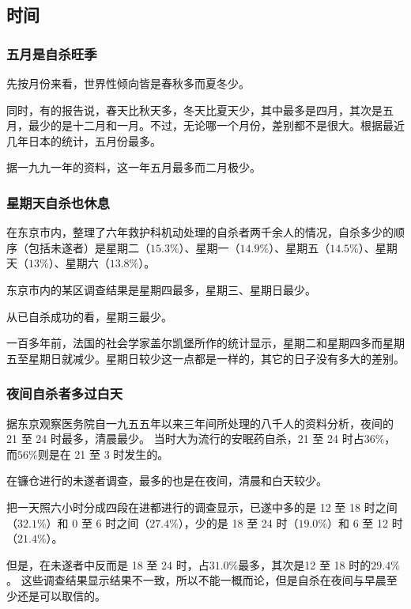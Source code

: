 \documentclass[UTF8]{ctexart}
\begin{document}
\subsection{时间}

\subsubsection*{五月是自杀旺季}

先按月份来看，世界性倾向皆是春秋多而夏冬少。

同时，有的报告说，春天比秋天多，冬天比夏天少，其中最多是四月，其次是五月，最少的是十二月和一月。不过，无论哪一个月份，差别都不是很大。根据最近几年日本的统计，五月份最多。

据一九九一年的资料，这一年五月最多而二月极少。

\subsubsection*{星期天自杀也休息}

在东京市内，整理了六年救护科机动处理的自杀者两千余人的情况，自杀多少的顺序（包括未遂者）是星期二（$15.3\%$）、星期一（$14.9\%$）、星期五（$14.5\%$）、星期天（$13\%$）、星期六（$13.8\%$）。

东京市内的某区调查结果是星期四最多，星期三、星期日最少。

从已自杀成功的看，星期三最少。

一百多年前，法国的社会学家盖尔凯堡所作的统计显示，星期二和星期四多而星期五至星期日就减少。星期日较少这一点都是一样的，其它的日子没有多大的差别。

\subsubsection*{夜间自杀者多过白天}

据东京观察医务院自一九五五年以来三年间所处理的八千人的资料分析，夜间的 21 至 24 时最多，清晨最少。
当时大为流行的安眠药自杀，21 至 24 时占$36\%$，而$56\%$则是在 21 至 3 时发生的。

在镰仓进行的未遂者调查，最多的也是在夜间，清晨和白天较少。

把一天照六小时分成四段在进都进行的调查显示，已遂中多的是 12 至 18 时之间（$32.1\%$）和 0 至 6 时之间（$27.4\%$），少的是 18 至 24 时（$19.0\%$）和 6 至 12 时 （$21.4\%$）。

但是，在未遂者中反而是 18 至 24 时，占$31.0\%$最多，其次是12 至 18 时的$29.4\%$。 这些调查结果显示结果不一致，所以不能一概而论，但是自杀在夜间与早晨至少还是可以取信的。
\end{document}
